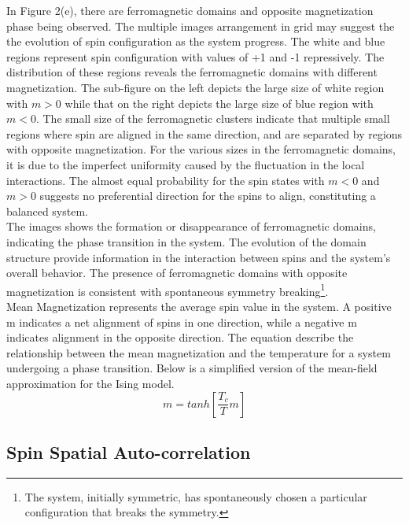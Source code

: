 In Figure 2(e), there are ferromagnetic domains and opposite magnetization phase being observed. The multiple images arrangement in grid may suggest the the evolution of spin configuration as the system progress. The white and blue regions represent spin configuration with values of +1 and -1 repressively.  The distribution of these regions reveals the ferromagnetic domains with different magnetization. The sub-figure on the left depicts the large size of white region with $m >0$ while that on the right depicts the large size of blue region with $m<0$. The small size of the ferromagnetic clusters indicate that multiple small regions where spin are aligned in the same direction, and are separated by regions with opposite magnetization. For the various sizes in the ferromagnetic domains, it is due to the imperfect uniformity caused by the fluctuation in the local interactions. The almost equal probability for the spin states with $m<0$ and $m>0$ suggests no preferential direction for the spins to align, constituting a balanced system. \\

The images shows the formation or disappearance of ferromagnetic domains, indicating the phase transition in the system. The evolution of the domain structure provide information in the interaction between spins and the system's overall behavior. The presence of ferromagnetic domains with opposite magnetization is consistent with spontaneous symmetry breaking\footnote{The system, initially symmetric, has spontaneously chosen a particular configuration that breaks the symmetry.}.  
\\

Mean Magnetization represents the average spin value in the system. A positive m indicates a net alignment of spins in one direction, while a negative m indicates alignment in the opposite direction. The equation describe the relationship between the mean magnetization and the temperature for a system undergoing a phase transition. Below is a simplified version of the mean-field approximation for the Ising model. \\

\begin{equation}
m = tanh[\frac{T_c}{T}m]
\end{equation}

\subsection{Spin Spatial Auto-correlation}

